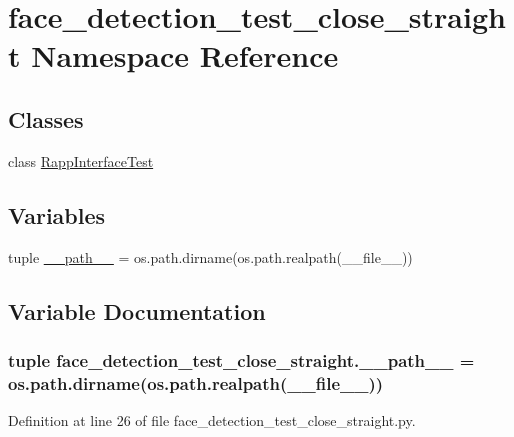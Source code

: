 \hypertarget{namespaceface__detection__test__close__straight}{\section{face\-\_\-detection\-\_\-test\-\_\-close\-\_\-straight Namespace Reference}
\label{namespaceface__detection__test__close__straight}
}
\subsection*{Classes}
\begin{DoxyCompactItemize}
\item 
class \hyperlink{classface__detection__test__close__straight_1_1RappInterfaceTest}{Rapp\-Interface\-Test}
\end{DoxyCompactItemize}
\subsection*{Variables}
\begin{DoxyCompactItemize}
\item 
tuple \hyperlink{namespaceface__detection__test__close__straight_a000c5db36c0500d6499c2504b2a22840}{\-\_\-\-\_\-path\-\_\-\-\_\-} = os.\-path.\-dirname(os.\-path.\-realpath(\-\_\-\-\_\-file\-\_\-\-\_\-))
\end{DoxyCompactItemize}


\subsection{Variable Documentation}
\hypertarget{namespaceface__detection__test__close__straight_a000c5db36c0500d6499c2504b2a22840}{
\subsubsection[{\-\_\-\-\_\-path\-\_\-\-\_\-}]{\setlength{\rightskip}{0pt plus 5cm}tuple face\-\_\-detection\-\_\-test\-\_\-close\-\_\-straight.\-\_\-\-\_\-path\-\_\-\-\_\- = os.\-path.\-dirname(os.\-path.\-realpath(\-\_\-\-\_\-file\-\_\-\-\_\-))}}\label{namespaceface__detection__test__close__straight_a000c5db36c0500d6499c2504b2a22840}


Definition at line 26 of file face\-\_\-detection\-\_\-test\-\_\-close\-\_\-straight.\-py.

